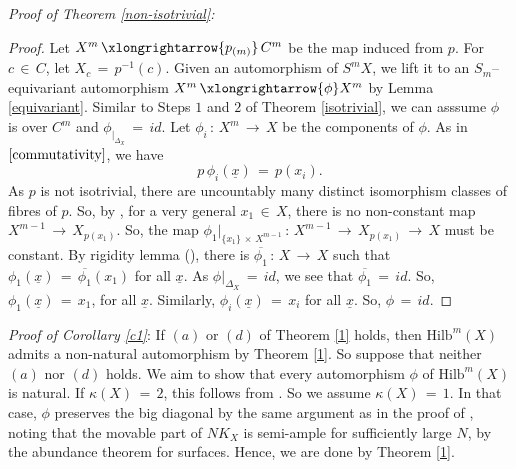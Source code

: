 \documentclass[12pt,reqno]{amsart}
\theoremstyle{definition}
\numberwithin{equation}{section}
\begin{document}
\textit{Proof of Theorem \ref{non-isotrivial}:}
\begin{proof}
Let $X^{m}\,\xlongrightarrow{p_{(m)}}\, C^{m}$ be the map induced from $p$. For $c\,\in \, C$, let $X_{c}\,=\, p^{-1}(c)$. Given an automorphism of $S^{m}X$, we lift it to an $S_m$--equivariant automorphism $X^{m}\,\xlongrightarrow{\phi}X^{m}$ by Lemma \ref{equivariant}.  Similar to Steps $1$ and $2$ of Theorem \ref{isotrivial}, we can asssume $\phi$ is over $C^{m}$ and $\phi_{|_{\Delta_{X}}}\,=\,{id}$. Let $\phi_{i}\,:\, X^{m}\,\longrightarrow\, X$ be the components of $\phi$. As in $\eqref{commutativity}$, we have 
\begin{equation*}
p\,\phi_{i}(\underline{x})\,=\, p(x_{i}).    
\end{equation*}
As $p$ is not isotrivial, there are uncountably many distinct isomorphism classes of fibres of $p$. So, by \cite[Theorem 2]{Mae}, for a very general $x_{1}\,\in\, X$, there is no non-constant map $X^{m-1}\,\longrightarrow\, X_{p(x_{1})}$. So, the map 
$\phi_1 \big|_{\{x_1\}\, \times\, X^{m-1}}
\,:\,X^{m-1}\,\longrightarrow\, X_{p(x_{1})}\,\longrightarrow\,X$ must be constant. By rigidity lemma (\cite[Page 40]{Mum}), there is $\overline{\phi_{1}}\,:\, X\,\longrightarrow\, X$ such that $\phi_{1}(\underline{x})\,=\,\overline{\phi_{1}}(x_{1})$ for all $\underline{x}$. As $\phi{|_{\Delta_{X}}}\,=\, {id}$, we see that $\overline{\phi_{1}}\,=\, {id}$. So, $\phi_{1}(\underline{x})\,=\, x_{1}$, for all $\underline{x}$. Similarly, $\phi_{i}(\underline{x})\,=\,x_{i}$ for all $\underline{x}$. So, $\phi\,=\, id$.
\end{proof}

\textit{Proof of Corollary \ref{c1}}:
If $(a)$ or $(d)$ of Theorem \ref{1} holds, then $\textrm{Hilb}^m(X)$ admits a non-natural automorphism by Theorem \ref{1}. So suppose that neither $(a)$ nor $(d)$ holds. We aim to show that every automorphism $\phi$ of $\textrm{Hilb}^m(X)$ is natural. If $\kappa(X)\,=\,2$, this follows from \cite{belmans2020automorphisms}. So we assume  $\kappa(X)\,=\,1$. In that case, $\phi$ preserves the big diagonal by the same argument as in the proof of {\cite[Theorem 3.3]{Ha}}, noting that the movable part of $NK_X$ is semi-ample for sufficiently large $N$, by the abundance theorem for surfaces. Hence, we are done by Theorem \ref{1}.
\end{document}
